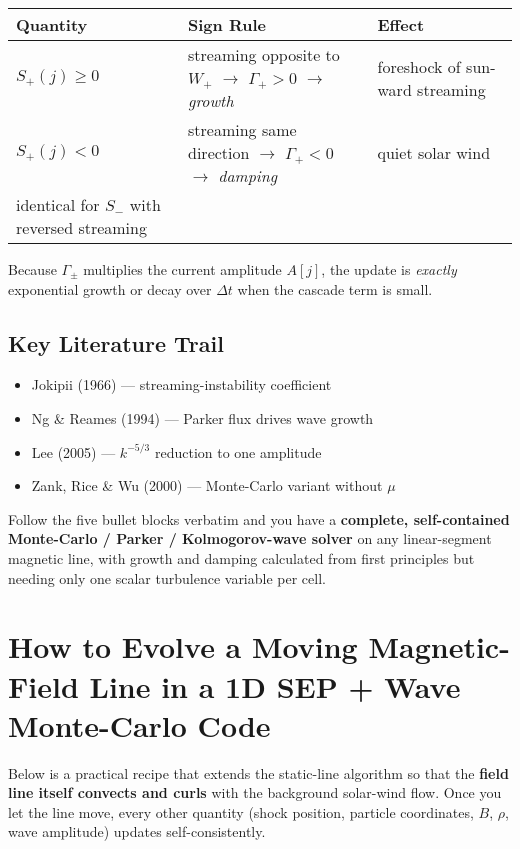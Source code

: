 \begin{tabular}{|l|l|l|}
\hline
\textbf{Quantity} & \textbf{Sign Rule} & \textbf{Effect} \\
\hline
$S_{+}(j) \ge 0$ & streaming opposite to $W_+$ $\rightarrow$ $\Gamma_+ > 0$ $\rightarrow$ \emph{growth} & foreshock of sun-ward streaming \\
$S_{+}(j) < 0$ & streaming same direction $\rightarrow$ $\Gamma_+ < 0$ $\rightarrow$ \emph{damping} & quiet solar wind \\
identical for $S_{-}$ with reversed streaming & & \\
\hline
\end{tabular}

Because $\Gamma_{\pm}$ multiplies the current amplitude $A[j]$, the update is \emph{exactly} exponential growth or decay over $\Delta t$ when the cascade term is small.

\subsection*{Key Literature Trail}

\begin{itemize}
\item Jokipii (1966) — streaming-instability coefficient
\item Ng \& Reames (1994) — Parker flux drives wave growth
\item Lee (2005) — $k^{-5/3}$ reduction to one amplitude
\item Zank, Rice \& Wu (2000) — Monte-Carlo variant without $\mu$
\end{itemize}

Follow the five bullet blocks verbatim and you have a \textbf{complete, self-contained Monte-Carlo / Parker / Kolmogorov-wave solver} on any linear-segment magnetic line, with growth and damping calculated from first principles but needing only one scalar turbulence variable per cell.


\section*{How to Evolve a Moving Magnetic-Field Line in a 1D SEP + Wave Monte-Carlo Code}

Below is a practical recipe that extends the static-line algorithm so that the \textbf{field line itself convects and curls} with the background solar-wind flow. Once you let the line move, every other quantity (shock position, particle coordinates, $B$, $\rho$, wave amplitude) updates self-consistently.

